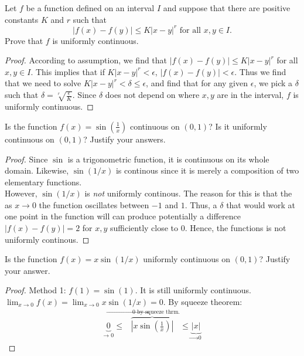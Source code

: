 \documentclass[12pt]{book}
\newenvironment{exercise}[2][Exercise]{\begin{trivlist}
\item[\hskip \labelsep {\bfseries #1}\hskip \labelsep {\bfseries #2.}]}{\end{trivlist}}
\begin{document}
\begin{exercise}{1.4.6}
\begin{exercise}{3.3.8}
Let $f$ be a function defined on an interval $I$ and suppose that there are positive constants $K$ and $r$ such that 
	\[ |f(x)-f(y)| \leq K |x-y|^r \text{ for all } x,y \in I. \]
Prove that $f$ is uniformly continuous.

	\begin{proof}
	According to assumption, we find that $|f(x)-f(y)| \leq K |x-y|^r$ for all $x,y \in I$. This implies that if $K | x-y|^r < \epsilon$, $|f(x)-f(y)|<\epsilon$. Thus we find that we need to solve $K |x-y|^r < \delta \leq \epsilon$, and find that for any given $\epsilon$, we pick a $\delta$ such that $\delta = \sqrt[r]{\frac{\epsilon}{K}}$. Since $\delta$ does not depend on where $x,y$ are in the interval, $f$ is uniformly continuous.
	\end{proof}
\end{exercise}



\begin{exercise}{3.3.9}
Is the function $f(x)=\sin(\frac{1}{x})$ continuous on $(0,1)$? Is it uniformly continuous on $(0,1)$? Justify your answers. 
	
	\begin{proof}
	Since $\sin$ is a trigonometric function, it is continuous on its whole domain. Likewise, $\sin(1/x)$ is continous since it is merely a composition of two elementary functions. \\
	However, $\sin(1/x)$ is \emph{not} uniformly continous. The reason for this is that the as $x \to 0$ the function oscillates between $-1$ and $1$. Thus, a $\delta$ that would work at one point in the function will can produce potentially a difference $|f(x)-f(y)|=2$ for $x,y$ sufficiently close to 0. Hence, the functions is not uniformly continous.
	\end{proof}
\end{exercise}


\begin{exercise}{3.3.10}
    Is the function $f(x)=x \sin(1/x)$ uniformly continuous on $(0,1)$? Justify your answer. \\
    
    \begin{proof}
    Method 1: $f(1)=\sin(1)$. It is still uniformly continuous. $\lim_{x \to 0} f(x)= \lim_{x \to 0} x \sin(1/x) = 0$. By squeeze theorem:
		\begin{align*}
		\underbrace{0}_\text{$\to$ 0} \leq \overbrace{|x \sin \left( \frac{1}{x} \right) |}^\text{$\to$ 0 by squeeze thrm.} \leq \underbrace{|x|}_\text{$\to$ 0}
		\end{align*}		       
         

\end{proof}
\end{exercise}
\end{exercise}
\end{document}
